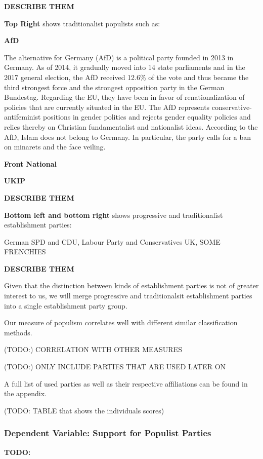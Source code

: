 \documentclass[]{article}
\begin{document}
\textbf{DESCRIBE THEM}

\textbf{Top Right} shows traditionalist populists such as:

\textbf{AfD}

The alternative for Germany (AfD) is a political party founded in 2013
in Germany. As of 2014, it gradually moved into 14 state parliaments and
in the 2017 general election, the AfD received 12.6\% of the vote and
thus became the third strongest force and the strongest opposition party
in the German Bundestag. Regarding the EU, they have been in favor of
renationalization of policies that are currently situated in the EU. The
AfD represents conservative-antifeminist positions in gender politics
and rejects gender equality policies and relies thereby on Christian
fundamentalist and nationalist ideas. According to the AfD, Islam does
not belong to Germany. In particular, the party calls for a ban on
minarets and the face veiling.

\textbf{Front National}

\textbf{UKIP}

\textbf{DESCRIBE THEM}

\textbf{Bottom left and bottom right} shows progressive and
traditionalist establishment parties:

German SPD and CDU, Labour Party and Conservatives UK, SOME FRENCHIES

\textbf{DESCRIBE THEM}

Given that the distinction between kinds of establishment parties is not
of greater interest to us, we will merge progressive and traditionalsit
establishment parties into a single establishment party group.

Our measure of populism correlates well with different similar
classification methods.

(TODO:) CORRELATION WITH OTHER MEASURES

(TODO:) ONLY INCLUDE PARTIES THAT ARE USED LATER ON

A full list of used parties as well as their respective affiliations can
be found in the appendix.

(TODO: TABLE that shows the individuals scores)

\subsubsection{Dependent Variable: Support for Populist
Parties}\label{dependent-variable-support-for-populist-parties}

\textbf{TODO:}
\end{document}
